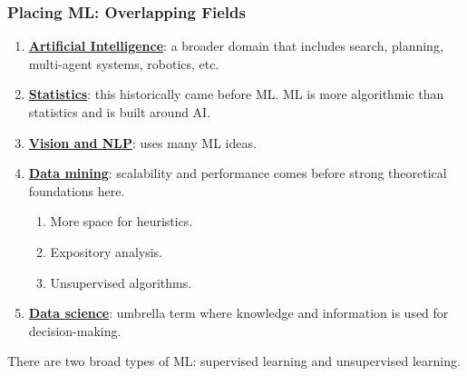 \documentclass[11pt]{scrartcl}
\theoremstyle{definition}
\theoremstyle{remark}
\newcommand{\dfn}[1]{\textbf{\underline{#1}}}
\begin{document}
\subsubsection{Placing ML: Overlapping Fields}
\begin{enumerate}[noitemsep]
	\item \dfn{Artificial Intelligence}: a broader domain that includes search, planning, multi-agent systems, robotics, etc. 
	\item \dfn{Statistics}: this historically came before ML. ML is more algorithmic than statistics and is built around AI. 
	\item \dfn{Vision and NLP}: uses many ML ideas. 
	\item \dfn{Data mining}: scalability and performance comes before strong theoretical foundations here. 
	\begin{enumerate}[noitemsep]
		\item More space for heuristics. 
		\item Expository analysis. 
		\item Unsupervised algorithms. 
	\end{enumerate}
	\item \dfn{Data science}: umbrella term where knowledge and information is used for decision-making. 
\end{enumerate}
There are two broad types of ML: supervised learning and unsupervised learning. 
\end{document}
